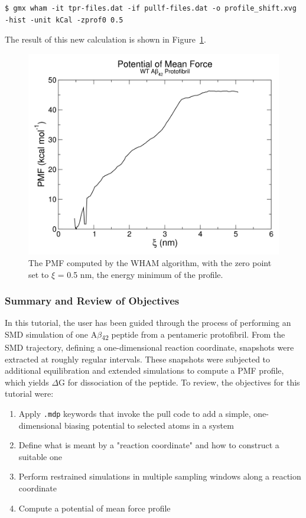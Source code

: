 \documentclass[9pt,tutorial,pubversion]{livecoms}
\begin{document}
\begin{lstlisting}
$ gmx wham -it tpr-files.dat -if pullf-files.dat -o profile_shift.xvg -hist -unit kCal -zprof0 0.5
\end{lstlisting}
%
The result of this new calculation is shown in Figure~\ref{umbrella_pmf_shift_fig}.

\begin{figure}[h!]
\centering
\includegraphics{umbrella_pmf_shift}
\caption{The PMF computed by the WHAM algorithm, with the zero point set to $\xi$ = 0.5 nm, the energy minimum of the profile.}
\label{umbrella_pmf_shift_fig}
\end{figure}

\subsubsection{Summary and Review of Objectives} \label{umbrella_summary}

In this tutorial, the user has been guided through the process of performing an SMD simulation of one A$\beta$\textsubscript{42} peptide from a pentameric protofibril. From the SMD trajectory, defining a one-dimensional reaction coordinate, snapshots were extracted at roughly regular intervals. These snapshots were subjected to additional equilibration and extended simulations to compute a PMF profile, which yields $\Delta$G for dissociation of the peptide. To review, the objectives for this tutorial were:

\begin{enumerate}
	\item Apply \texttt{.mdp} keywords that invoke the pull code to add a simple, one-dimensional biasing potential to selected atoms in a system
	\item Define what is meant by a "reaction coordinate" and how to construct a suitable one
	\item Perform restrained simulations in multiple sampling windows along a reaction coordinate
	\item Compute a potential of mean force profile
\end{enumerate}
\end{document}
